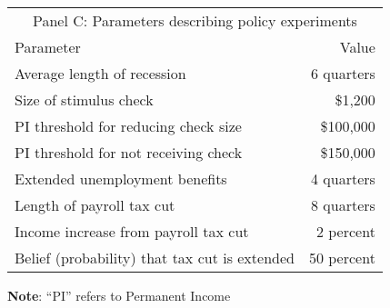 \documentclass{econsocart}
\begin{document}
\begin{table}[tb]
  \begin{tabular*}
    {\textwidth}{@{\extracolsep{\fill}}lr@{}}
    \multicolumn{2}{c}{\small Panel C: Parameters describing policy experiments} \\
    \addlinespace
    \hline
    Parameter                                        & Value \\ \hline
    Average length of recession                      & 6 quarters \\
    Size of stimulus check                           & \$1,200 \\
    PI threshold for reducing check size             & \$100,000 \\
    PI threshold for not receiving check             & \$150,000 \\
    Extended unemployment benefits                   & 4 quarters \\
    Length of payroll tax cut                        & 8 quarters \\
    Income increase from payroll tax cut             & 2 percent \\
    Belief (probability) that tax cut is extended    & 50 percent \\
    \hline
  \end{tabular*}

  \vspace{0.5em}
  \noindent\parbox{\textwidth}{\footnotesize
    \textbf{Note}: ``PI'' refers to Permanent Income}
  \vspace{0.5em}
\end{table}
\end{document}
